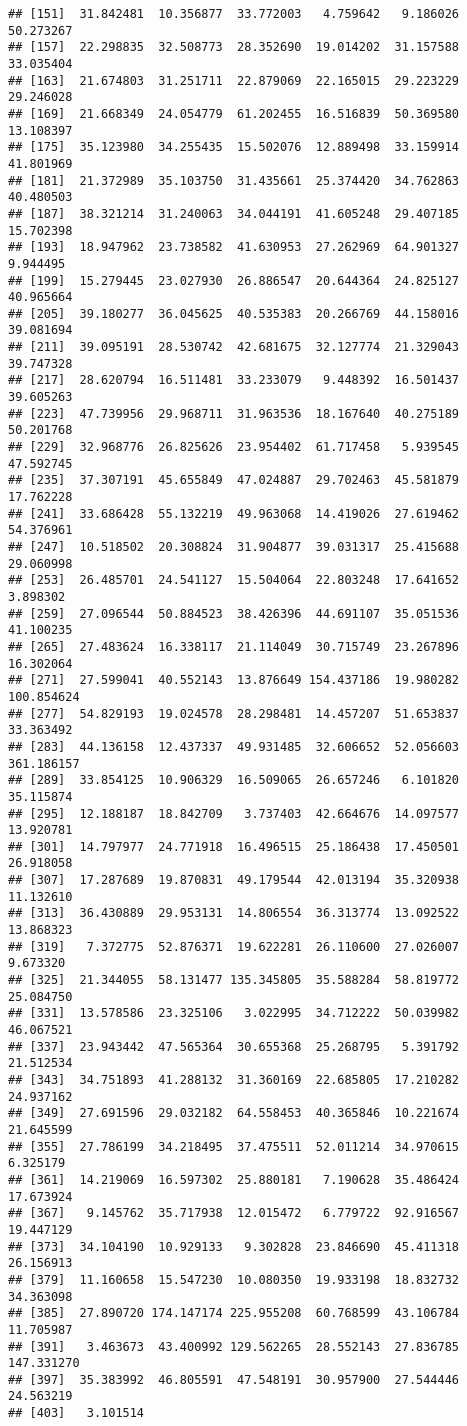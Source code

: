 \documentclass[
]{article}
\begin{document}
\begin{verbatim}
## [151]  31.842481  10.356877  33.772003   4.759642   9.186026  50.273267
## [157]  22.298835  32.508773  28.352690  19.014202  31.157588  33.035404
## [163]  21.674803  31.251711  22.879069  22.165015  29.223229  29.246028
## [169]  21.668349  24.054779  61.202455  16.516839  50.369580  13.108397
## [175]  35.123980  34.255435  15.502076  12.889498  33.159914  41.801969
## [181]  21.372989  35.103750  31.435661  25.374420  34.762863  40.480503
## [187]  38.321214  31.240063  34.044191  41.605248  29.407185  15.702398
## [193]  18.947962  23.738582  41.630953  27.262969  64.901327   9.944495
## [199]  15.279445  23.027930  26.886547  20.644364  24.825127  40.965664
## [205]  39.180277  36.045625  40.535383  20.266769  44.158016  39.081694
## [211]  39.095191  28.530742  42.681675  32.127774  21.329043  39.747328
## [217]  28.620794  16.511481  33.233079   9.448392  16.501437  39.605263
## [223]  47.739956  29.968711  31.963536  18.167640  40.275189  50.201768
## [229]  32.968776  26.825626  23.954402  61.717458   5.939545  47.592745
## [235]  37.307191  45.655849  47.024887  29.702463  45.581879  17.762228
## [241]  33.686428  55.132219  49.963068  14.419026  27.619462  54.376961
## [247]  10.518502  20.308824  31.904877  39.031317  25.415688  29.060998
## [253]  26.485701  24.541127  15.504064  22.803248  17.641652   3.898302
## [259]  27.096544  50.884523  38.426396  44.691107  35.051536  41.100235
## [265]  27.483624  16.338117  21.114049  30.715749  23.267896  16.302064
## [271]  27.599041  40.552143  13.876649 154.437186  19.980282 100.854624
## [277]  54.829193  19.024578  28.298481  14.457207  51.653837  33.363492
## [283]  44.136158  12.437337  49.931485  32.606652  52.056603 361.186157
## [289]  33.854125  10.906329  16.509065  26.657246   6.101820  35.115874
## [295]  12.188187  18.842709   3.737403  42.664676  14.097577  13.920781
## [301]  14.797977  24.771918  16.496515  25.186438  17.450501  26.918058
## [307]  17.287689  19.870831  49.179544  42.013194  35.320938  11.132610
## [313]  36.430889  29.953131  14.806554  36.313774  13.092522  13.868323
## [319]   7.372775  52.876371  19.622281  26.110600  27.026007   9.673320
## [325]  21.344055  58.131477 135.345805  35.588284  58.819772  25.084750
## [331]  13.578586  23.325106   3.022995  34.712222  50.039982  46.067521
## [337]  23.943442  47.565364  30.655368  25.268795   5.391792  21.512534
## [343]  34.751893  41.288132  31.360169  22.685805  17.210282  24.937162
## [349]  27.691596  29.032182  64.558453  40.365846  10.221674  21.645599
## [355]  27.786199  34.218495  37.475511  52.011214  34.970615   6.325179
## [361]  14.219069  16.597302  25.880181   7.190628  35.486424  17.673924
## [367]   9.145762  35.717938  12.015472   6.779722  92.916567  19.447129
## [373]  34.104190  10.929133   9.302828  23.846690  45.411318  26.156913
## [379]  11.160658  15.547230  10.080350  19.933198  18.832732  34.363098
## [385]  27.890720 174.147174 225.955208  60.768599  43.106784  11.705987
## [391]   3.463673  43.400992 129.562265  28.552143  27.836785 147.331270
## [397]  35.383992  46.805591  47.548191  30.957900  27.544446  24.563219
## [403]   3.101514
\end{verbatim}
\end{document}
